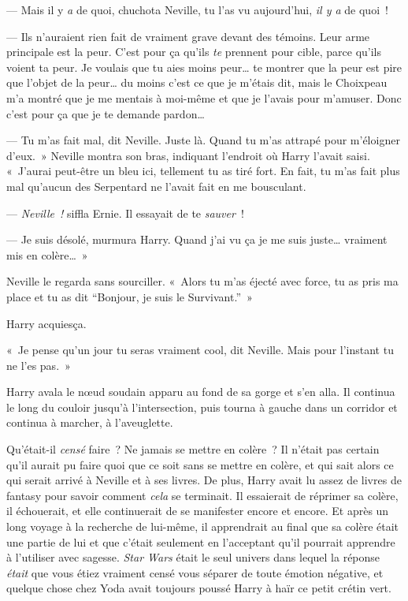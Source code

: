 --- Mais il y \emph{a} de quoi, chuchota Neville, tu l'as vu aujourd'hui, \emph{il y a} de quoi~!

--- Ils n'auraient rien fait de vraiment grave devant des témoins.
Leur arme principale est la peur.
C'est pour ça qu'ils \emph{te} prennent pour cible, parce qu'ils voient ta peur.
Je voulais que tu aies moins peur… te montrer que la peur est pire que l'objet de la peur… du moins c'est ce que je m'étais dit, mais le Choixpeau m'a montré que je me mentais à moi-même et que je l'avais pour m'amuser.
Donc c'est pour ça que je te demande pardon…

--- Tu m'as fait mal, dit Neville. Juste là.
Quand tu m'as attrapé pour m'éloigner d'eux.~»
Neville montra son bras, indiquant l'endroit où Harry l'avait saisi.
«~J'aurai peut-être un bleu ici, tellement tu as tiré fort.
En fait, tu m'as fait plus mal qu'aucun des Serpentard ne l'avait fait en me bousculant.

--- \emph{Neville~!} siffla Ernie. Il essayait de te \emph{sauver}~!

--- Je suis désolé, murmura Harry. Quand j'ai vu ça je me suis juste… vraiment mis en colère…~»

Neville le regarda sans sourciller.
«~Alors tu m'as éjecté avec force, tu as pris ma place et tu as dit “Bonjour, je suis le Survivant.”~»

Harry acquiesça.

«~Je pense qu'un jour tu seras vraiment cool, dit Neville. Mais pour l'instant tu ne l'es pas.~»

Harry avala le nœud soudain apparu au fond de sa gorge et s'en alla.
Il continua le long du couloir jusqu'à l'intersection, puis tourna à gauche dans un corridor et continua à marcher, à l'aveuglette.

Qu'était-il \emph{censé} faire~? Ne jamais se mettre en colère~?
Il n'était pas certain qu'il aurait pu faire quoi que ce soit sans se mettre en colère, et qui sait alors ce qui serait arrivé à Neville et à ses livres.
De plus, Harry avait lu assez de livres de fantasy pour savoir comment \emph{cela} se terminait.
Il essaierait de réprimer sa colère, il échouerait, et elle continuerait de se manifester encore et encore.
Et après un long voyage à la recherche de lui-même, il apprendrait au final que sa colère était une partie de lui et que c'était seulement en l'acceptant qu'il pourrait apprendre à l'utiliser avec sagesse.
\emph{Star Wars} était le seul univers dans lequel la réponse \emph{était} que vous étiez vraiment censé vous séparer de toute émotion négative, et quelque chose chez Yoda avait toujours poussé Harry à haïr ce petit crétin vert.

